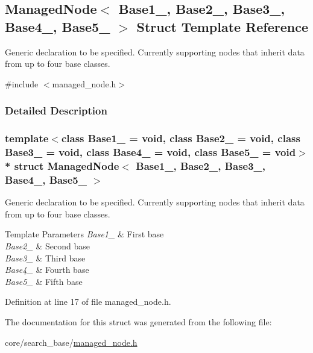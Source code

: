 \hypertarget{structManagedNode}{}\subsection{Managed\+Node$<$ Base1\+\_\+, Base2\+\_\+, Base3\+\_\+, Base4\+\_\+, Base5\+\_\+ $>$ Struct Template Reference}
\label{structManagedNode}


Generic declaration to be specified. Currently supporting nodes that inherit data from up to four base classes.  




{\ttfamily \#include $<$managed\+\_\+node.\+h$>$}



\subsubsection{Detailed Description}
\subsubsection*{template$<$class Base1\+\_\+ = void, class Base2\+\_\+ = void, class Base3\+\_\+ = void, class Base4\+\_\+ = void, class Base5\+\_\+ = void$>$\\*
struct Managed\+Node$<$ Base1\+\_\+, Base2\+\_\+, Base3\+\_\+, Base4\+\_\+, Base5\+\_\+ $>$}

Generic declaration to be specified. Currently supporting nodes that inherit data from up to four base classes. 


\begin{DoxyTemplParams}{Template Parameters}
{\em Base1\+\_\+} & First base \\
\hline
{\em Base2\+\_\+} & Second base \\
\hline
{\em Base3\+\_\+} & Third base \\
\hline
{\em Base4\+\_\+} & Fourth base \\
\hline
{\em Base5\+\_\+} & Fifth base \\
\hline
\end{DoxyTemplParams}


Definition at line 17 of file managed\+\_\+node.\+h.



The documentation for this struct was generated from the following file\+:\begin{DoxyCompactItemize}
\item 
core/search\+\_\+base/\hyperlink{managed__node_8h}{managed\+\_\+node.\+h}\end{DoxyCompactItemize}
